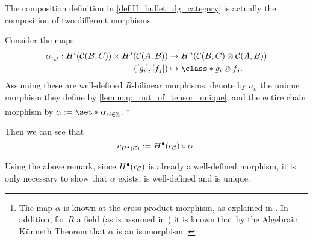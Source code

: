 \begin{remark}
    \label{rem:H_bullet_composition_alpha}
    The composition definition in \autoref{def:H_bullet_dg_category} is actually the composition of two different morphisms.

    Consider the maps
    \begin{align*}
        \alpha_{i, j}: H^i(\Cc(B, C)) \times H^j(\Cc(A, B)) &\to H^n(\Cc(B, C) \otimes \Cc(A, B)) \\
        ([g_i], [f_j]) &\mapsto \class*{g_i \otimes f_j}.
    \end{align*}
    Assuming these are well-defined \( R \)-bilinear morphisms, denote by \( a_n \) the unique morphism they define by \autoref{lem:map_out_of_tensor_unique}, and the entire chain morphism by \( \alpha := \set*{\alpha_i}_{i \in \Zb} \). \footnote{
        The map \( \alpha \) is known at the cross product morphism, as explained in \cite[p.\ 273]{Hatcher_2002}. In addition, for \( R \) a field (as is assumed in \cite{Jasso-Muro_2023}) it is known that by the Algebraic Künneth Theorem that \( \alpha \) is an isomorphism \cite[Theorem 3B.5]{Hatcher_2002}.
    }
    
    Then we can see that
    \[
        c_{H^\bullet({\mathcal{C}})} := H^\bullet(c_{{\mathcal{C}}}) \circ \alpha.
    \] 
\end{remark}

Using the above remark, since \( H^{\bullet}(c_{{\mathcal{C}}}) \) is already a well-defined morphism, it is only necessary to show that \( \alpha \) exists, is well-defined and is unique.

